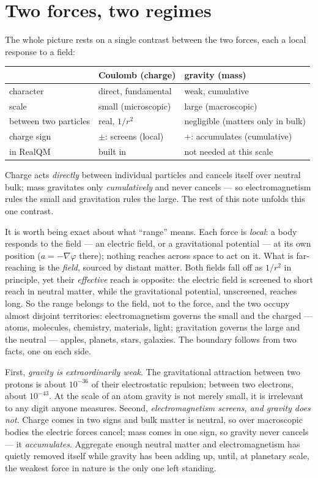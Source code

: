 \documentclass[11pt]{article}
\begin{document}
\section{Two forces, two regimes}
The whole picture rests on a single contrast between the two forces, each a local response to a field:
\begin{center}
\begin{tabular}{lll}
\hline
 & \textbf{Coulomb (charge)} & \textbf{gravity (mass)} \\
\hline
character     & direct, fundamental          & weak, cumulative \\
scale         & small (microscopic)          & large (macroscopic) \\
between two particles & real, $1/r^2$         & negligible (matters only in bulk) \\
charge sign   & $\pm$: screens (local)       & $+$: accumulates (cumulative) \\
in RealQM     & built in                     & not needed at this scale \\
\hline
\end{tabular}
\end{center}
\noindent Charge acts \emph{directly} between individual particles and cancels itself over neutral bulk;
mass gravitates only \emph{cumulatively} and never cancels --- so electromagnetism rules the small and gravitation
rules the large. The rest of this note unfolds this one contrast.

It is worth being exact about what ``range'' means. Each force is \emph{local}: a body responds to the field --- an
electric field, or a gravitational potential --- at its own position ($a=-\nabla\varphi$ there); nothing reaches
across space to act on it. What is far-reaching is the \emph{field}, sourced by distant matter. Both fields fall
off as $1/r^2$ in principle, yet their \emph{effective} reach is opposite: the electric field is screened to short
reach in neutral matter, while the gravitational potential, unscreened, reaches long. So the range belongs to the
field, not to the force, and the two occupy almost disjoint territories: electromagnetism governs the small and the
charged --- atoms, molecules, chemistry, materials, light; gravitation governs the large and the neutral ---
apples, planets, stars, galaxies. The boundary follows from two facts, one on each side.

First, \emph{gravity is extraordinarily weak}. The gravitational attraction between two protons is about
$10^{-36}$ of their electrostatic repulsion; between two electrons, about $10^{-43}$. At the scale of an atom
gravity is not merely small, it is irrelevant to any digit anyone measures. Second, \emph{electromagnetism screens,
and gravity does not}. Charge comes in two signs and bulk matter is neutral, so over macroscopic bodies the
electric forces cancel; mass comes in one sign, so gravity never cancels --- it \emph{accumulates}. Aggregate
enough neutral matter and electromagnetism has quietly removed itself while gravity has been adding up, until, at
planetary scale, the weakest force in nature is the only one left standing.
\end{document}
